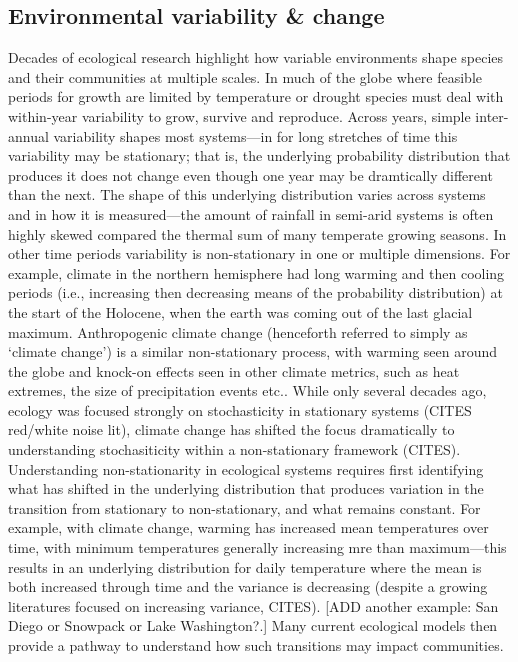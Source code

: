 \documentclass[11pt,letterpaper]{article}
\begin{document}
\subsection{Environmental variability \& change}

Decades of ecological research highlight how variable environments shape species and their communities at multiple scales.  In much of the globe where feasible periods for growth are limited by temperature or drought species must deal with within-year variability to grow, survive and reproduce. Across years, simple inter-annual variability shapes most systems---in for long stretches of time this variability may be stationary; that is, the underlying probability distribution that produces it does not change even though one year may be dramtically different than the next. The shape of this underlying distribution varies across systems and in how it is measured---the amount of rainfall in semi-arid systems is often highly skewed compared the thermal sum of many temperate growing seasons. In other time periods variability is non-stationary in one or multiple dimensions. For example, climate in the northern hemisphere had long warming and then cooling periods (i.e., increasing then decreasing means of the probability distribution) at the start of the Holocene, when the earth was coming out of the last glacial maximum. Anthropogenic climate change (henceforth referred to simply as `climate change') is a similar non-stationary process, with warming seen around the globe and knock-on effects seen in other climate metrics, such as heat extremes, the size of precipitation events etc.. While only several decades ago, ecology was focused strongly on stochasticity in stationary systems (CITES red/white noise lit), climate change has shifted the focus dramatically to understanding stochasiticity within a non-stationary framework (CITES).\\

Understanding non-stationarity in ecological systems requires first identifying what has shifted in the underlying distribution that produces variation in the transition from stationary to non-stationary, and what remains constant. For example, with climate change, warming has increased mean temperatures over time, with minimum temperatures generally increasing mre than maximum---this results in an underlying distribution for daily temperature where the mean is both increased through time and the variance is decreasing (despite a growing literatures focused on increasing variance, CITES). [ADD another example: San Diego or Snowpack or Lake Washington?.]  Many current ecological models then provide a pathway to understand how such transitions may impact communities. \\
\end{document}
